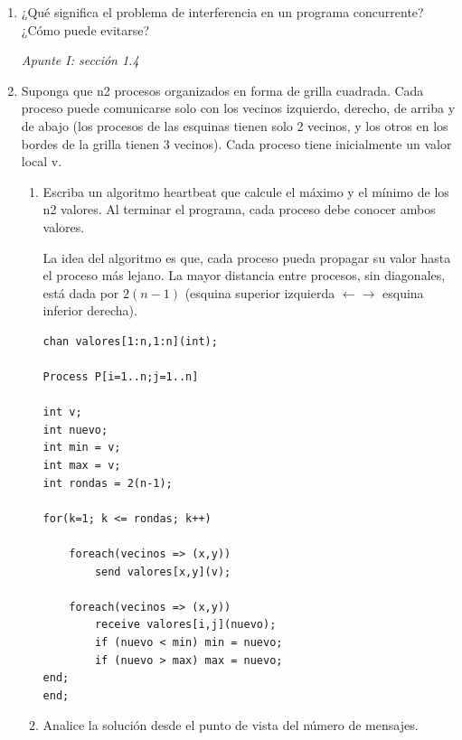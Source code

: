 \documentclass[a4paper, 10pt]{article}
\newenvironment{QandA}{
    \begin{enumerate}\bfseries}
    {\end{enumerate}
}
\newenvironment{answered}{\par\normalfont}{}
\begin{document}
\begin{QandA}
\begin{enumerate}
\begin{answered}
El programa finalizará con \lstinline{aux = 16 o 7}.
\end{answered}
\end{enumerate}

\item ¿Qué significa el problema de interferencia en un programa concurrente? ¿Cómo puede evitarse? 
\begin{answered}
\emph{Apunte I: sección 1.4}
\end{answered}



\item Suponga que n2 procesos organizados en forma de grilla cuadrada. Cada proceso puede comunicarse solo con los vecinos izquierdo, derecho, de arriba y de abajo (los procesos de las esquinas tienen solo 2 vecinos, y los otros en los bordes de la grilla tienen 3 vecinos). Cada proceso tiene inicialmente un valor local v.
\begin{enumerate}
\item Escriba un algoritmo heartbeat que calcule el máximo y el mínimo de los n2 valores. Al terminar el programa, cada proceso debe conocer ambos valores.
\begin{answered}
La idea del algoritmo es que, cada proceso pueda propagar su valor hasta el proceso más lejano. La mayor distancia entre procesos, sin diagonales, está dada por $2(n-1)$ (esquina superior izquierda $\leftarrow \rightarrow$ esquina inferior derecha).
\end{answered}

\begin{lstlisting}
chan valores[1:n,1:n](int);

Process P[i=1..n;j=1..n]

int v;
int nuevo;
int min = v;
int max = v;
int rondas = 2(n-1);

for(k=1; k <= rondas; k++)

    foreach(vecinos => (x,y))
        send valores[x,y](v);

    foreach(vecinos => (x,y))
        receive valores[i,j](nuevo);
        if (nuevo < min) min = nuevo;
        if (nuevo > max) max = nuevo;
end;
end;
\end{lstlisting}


\item Analice la solución desde el punto de vista del número de mensajes.
\begin{answered}


\end{answered}
\end{enumerate}
\end{QandA}
\end{document}
